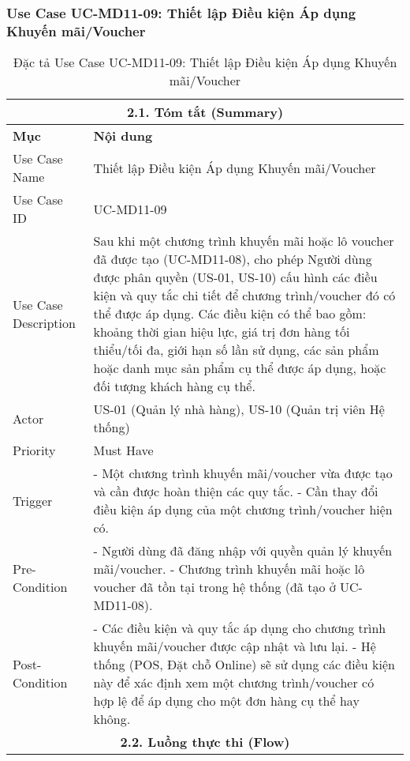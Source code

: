 \subsubsection{Use Case UC-MD11-09: Thiết lập Điều kiện Áp dụng Khuyến mãi/Voucher}
\begin{longtable}{|m{4cm}|p{11cm}|}
\caption{Đặc tả Use Case UC-MD11-09: Thiết lập Điều kiện Áp dụng Khuyến mãi/Voucher} \label{tab:uc_md11_09_set_promo_conditions} \\
\hline
\multicolumn{2}{|c|}{\textbf{2.1. Tóm tắt (Summary)}} \\
\hline
\textbf{Mục} & \textbf{Nội dung} \\
\hline
\endhead
\midrule
\endfoot
\bottomrule
\endlastfoot
Use Case Name & Thiết lập Điều kiện Áp dụng Khuyến mãi/Voucher \\
\hline
Use Case ID & UC-MD11-09 \\
\hline
Use Case Description & Sau khi một chương trình khuyến mãi hoặc lô voucher đã được tạo (UC-MD11-08), cho phép Người dùng được phân quyền (US-01, US-10) cấu hình các điều kiện và quy tắc chi tiết để chương trình/voucher đó có thể được áp dụng. Các điều kiện có thể bao gồm: khoảng thời gian hiệu lực, giá trị đơn hàng tối thiểu/tối đa, giới hạn số lần sử dụng, các sản phẩm hoặc danh mục sản phẩm cụ thể được áp dụng, hoặc đối tượng khách hàng cụ thể. \\
\hline
Actor & US-01 (Quản lý nhà hàng), US-10 (Quản trị viên Hệ thống) \\
\hline
Priority & Must Have \\
\hline
Trigger & - Một chương trình khuyến mãi/voucher vừa được tạo và cần được hoàn thiện các quy tắc. \newline - Cần thay đổi điều kiện áp dụng của một chương trình/voucher hiện có. \\
\hline
Pre-Condition & - Người dùng đã đăng nhập với quyền quản lý khuyến mãi/voucher. \newline - Chương trình khuyến mãi hoặc lô voucher đã tồn tại trong hệ thống (đã tạo ở UC-MD11-08). \\
\hline
Post-Condition & - Các điều kiện và quy tắc áp dụng cho chương trình khuyến mãi/voucher được cập nhật và lưu lại. \newline - Hệ thống (POS, Đặt chỗ Online) sẽ sử dụng các điều kiện này để xác định xem một chương trình/voucher có hợp lệ để áp dụng cho một đơn hàng cụ thể hay không. \\
\hline
\multicolumn{2}{|c|}{\textbf{2.2. Luồng thực thi (Flow)}} \\

\end{longtable}
